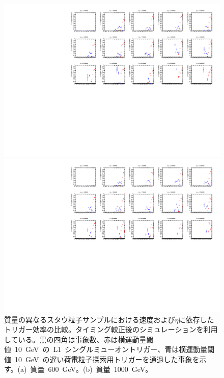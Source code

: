\begin{figure}[tbp]
    \begin{minipage}{0.49\hsize}
    \centering   
    \includegraphics[width=\textwidth,page=16]{img/rec/stau_600.pdf}
    \subcaption{}
    \end{minipage}
    \begin{minipage}{0.49\hsize}
    \centering   
    \includegraphics[width=\textwidth,page=16]{img/rec/stau_1000.pdf}
    \subcaption{}
    \end{minipage}
    \caption[質量の異なるスタウ粒子サンプルにおける速度および$\eta$に依存したトリガー効率の比較]{質量の異なるスタウ粒子サンプルにおける速度および$\eta$に依存したトリガー効率の比較。タイミング較正後のシミュレーションを利用している。黒の四角は事象数、赤は横運動量閾値~10~GeV~の~L1~シングルミューオントリガー、青は横運動量閾値~10~GeV~の遅い荷電粒子探索用トリガーを通過した事象を示す。(a)~質量~600~GeV。(b)~質量~1000~GeV。}\label{fig:trietabeta6}
\end{figure}

